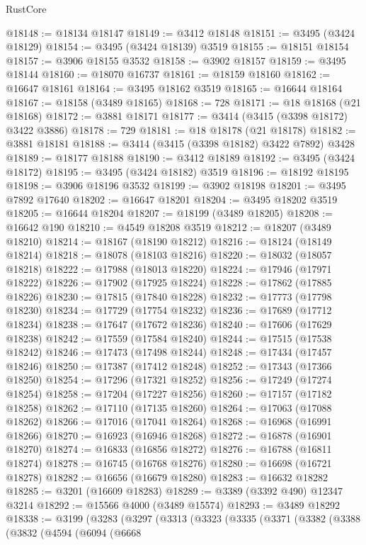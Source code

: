 \begin{lexlean}{RustCore}
\begin{coremodule}
@18148 := @18134 @18147
@18149 := @3412 @18148
@18151 := @3495 (@3424 @18129)
@18154 := @3495 (@3424 @18139) @3519
@18155 := @18151 @18154
@18157 := @3906 @18155 @3532
@18158 := @3902 @18157
@18159 := @3495 @18144
@18160 := @18070 @16737
@18161 := @18159 @18160
@18162 := @16647 @18161
@18164 := @3495 @18162 @3519
@18165 := @16644 @18164
@18167 := @18158 (@3489 @18165)
@18168 := 728
@18171 := @18 @18168 (@21 @18168)
@18172 := @3881 @18171
@18177 := @3414 (@3415 (@3398 @18172) @3422 @3886)
@18178 := 729
@18181 := @18 @18178 (@21 @18178)
@18182 := @3881 @18181
@18188 := @3414 (@3415 (@3398 @18182) @3422 @7892) @3428
@18189 := @18177 @18188
@18190 := @3412 @18189
@18192 := @3495 (@3424 @18172)
@18195 := @3495 (@3424 @18182) @3519
@18196 := @18192 @18195
@18198 := @3906 @18196 @3532
@18199 := @3902 @18198
@18201 := @3495 @7892 @17640
@18202 := @16647 @18201
@18204 := @3495 @18202 @3519
@18205 := @16644 @18204
@18207 := @18199 (@3489 @18205)
@18208 := @16642 @190
@18210 := @4549 @18208 @3519
@18212 := @18207 (@3489 @18210)
@18214 := @18167 (@18190 @18212)
@18216 := @18124 (@18149 @18214)
@18218 := @18078 (@18103 @18216)
@18220 := @18032 (@18057 @18218)
@18222 := @17988 (@18013 @18220)
@18224 := @17946 (@17971 @18222)
@18226 := @17902 (@17925 @18224)
@18228 := @17862 (@17885 @18226)
@18230 := @17815 (@17840 @18228)
@18232 := @17773 (@17798 @18230)
@18234 := @17729 (@17754 @18232)
@18236 := @17689 (@17712 @18234)
@18238 := @17647 (@17672 @18236)
@18240 := @17606 (@17629 @18238)
@18242 := @17559 (@17584 @18240)
@18244 := @17515 (@17538 @18242)
@18246 := @17473 (@17498 @18244)
@18248 := @17434 (@17457 @18246)
@18250 := @17387 (@17412 @18248)
@18252 := @17343 (@17366 @18250)
@18254 := @17296 (@17321 @18252)
@18256 := @17249 (@17274 @18254)
@18258 := @17204 (@17227 @18256)
@18260 := @17157 (@17182 @18258)
@18262 := @17110 (@17135 @18260)
@18264 := @17063 (@17088 @18262)
@18266 := @17016 (@17041 @18264)
@18268 := @16968 (@16991 @18266)
@18270 := @16923 (@16946 @18268)
@18272 := @16878 (@16901 @18270)
@18274 := @16833 (@16856 @18272)
@18276 := @16788 (@16811 @18274)
@18278 := @16745 (@16768 @18276)
@18280 := @16698 (@16721 @18278)
@18282 := @16656 (@16679 @18280)
@18283 := @16632 @18282
@18285 := @3201 (@16609 @18283)
@18289 := @3389 (@3392 @490) @12347 @3214
@18292 := @15566 @4000 (@3489 @15574)
@18293 := @3489 @18292
@18338 := @3199
    (@3283
      (@3297
        (@3313
          (@3323
            (@3335
              (@3371
                (@3382
                  (@3388
                    (@3832
                      (@4594
                        (@6094
                          (@6668

\end{coremodule}
\end{lexlean}
